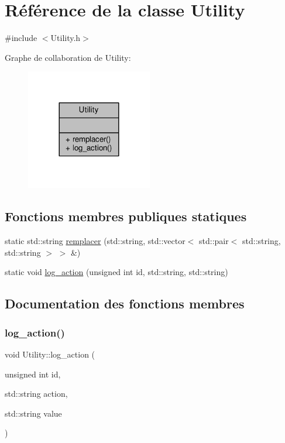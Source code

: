 \hypertarget{classUtility}{}\section{Référence de la classe Utility}
\label{classUtility}


{\ttfamily \#include $<$Utility.\+h$>$}



Graphe de collaboration de Utility\+:\nopagebreak
\begin{figure}[H]
\begin{center}
\leavevmode
\includegraphics[width=156pt]{classUtility__coll__graph}
\end{center}
\end{figure}
\subsection*{Fonctions membres publiques statiques}
\begin{DoxyCompactItemize}
\item 
static std\+::string \hyperlink{classUtility_a954a0d1bb807e5aa0c3d7c7d1059c5fb}{remplacer} (std\+::string, std\+::vector$<$ std\+::pair$<$ std\+::string, std\+::string $>$ $>$ \&)
\item 
static void \hyperlink{classUtility_ad60c39b61fe45ce689004b818c4b6e2b}{log\+\_\+action} (unsigned int id, std\+::string, std\+::string)
\end{DoxyCompactItemize}


\subsection{Documentation des fonctions membres}
\mbox{\label{classUtility_ad60c39b61fe45ce689004b818c4b6e2b}} 
\subsubsection{\texorpdfstring{log\+\_\+action()}{log\_action()}}
{\footnotesize\ttfamily void Utility\+::log\+\_\+action (\begin{DoxyParamCaption}\item[{unsigned int}]{id,  }\item[{std\+::string}]{action,  }\item[{std\+::string}]{value }\end{DoxyParamCaption})\hspace{0.3cm}{\ttfamily [static]}}



